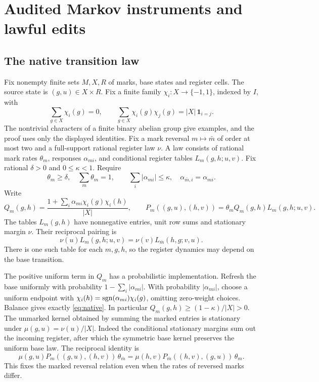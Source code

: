 \section{Audited Markov instruments and lawful edits}\label{sec:model}

\subsection{The native transition law}

Fix nonempty finite sets \(M,X,R\) of marks, base states and register cells.
The source state is \((g,u)\in X\times R\). Fix a finite family
\(\chi_i:X\to\{-1,1\}\), indexed by \(I\), with
\[
 \sum_{g\in X}\chi_i(g)=0,\qquad
 \sum_{g\in X}\chi_i(g)\chi_j(g)=|X|\,\mathbf 1_{i=j}.
\]
The nontrivial characters of a finite binary abelian group give examples,
and the proof uses only the displayed identities. Fix a mark reversal
\(m\mapsto\bar m\) of order at most two and a full-support rational
register law \(\nu\). A law consists of rational mark rates \(\theta_m\),
responses \(\alpha_{mi}\), and conditional register tables \(L_m(g,h;u,v)\).
Fix rational \(\delta>0\) and \(0\leq\kappa<1\).
Require
\begin{equation}\label{eq:guards}
 \theta_m\ge\delta,\quad \sum_m\theta_m=1,\qquad
 \sum_i|\alpha_{mi}|\le\kappa,\quad
 \alpha_{\bar m,i}=\alpha_{mi}.
\end{equation}
Write
\begin{equation}\label{eq:native}
 Q_m(g,h)=\frac{1+\sum_i\alpha_{mi}\chi_i(g)\chi_i(h)}{|X|},
 \qquad
 P_m((g,u),(h,v))=\theta_m Q_m(g,h)L_m(g,h;u,v).
\end{equation}
The tables \(L_m(g,h)\) have nonnegative entries, unit row sums and
stationary margin \(\nu\). Their reciprocal pairing is
\[
 \nu(u)L_m(g,h;u,v)=\nu(v)L_{\bar m}(h,g;v,u).
\]
There is one such table for each \(m,g,h\), so the register dynamics may
depend on the base transition.

The positive uniform term in \(Q_m\) has a probabilistic implementation.
Refresh the base uniformly with probability \(1-\sum_i|\alpha_{mi}|\).
With probability \(|\alpha_{mi}|\), choose a uniform endpoint with
\(\chi_i(h)=\operatorname{sgn}(\alpha_{mi})\chi_i(g)\), omitting zero-weight choices.
Balance gives exactly \eqref{eq:native}. In particular
\(Q_m(g,h)\ge(1-\kappa)/|X|>0\).
The unmarked kernel obtained by summing the marked entries is stationary
under \(\mu(g,u)=\nu(u)/|X|\). Indeed the conditional stationary margins
sum out the incoming register, after which the symmetric base kernel
preserves the uniform base law. The reciprocal identity is
\[
 \mu(g,u)P_m((g,u),(h,v))\,\theta_{\bar m}
 =
 \mu(h,v)P_{\bar m}((h,v),(g,u))\,\theta_m .
\]
This fixes the marked reversal relation even when the rates of reversed marks
differ.

